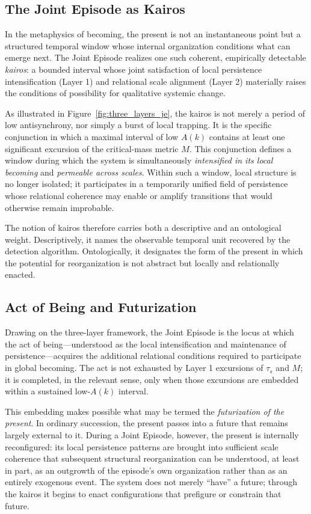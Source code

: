 \subsection{The Joint Episode as Kairos}

In the metaphysics of becoming, the present is not an instantaneous point but a structured temporal window whose internal organization conditions what can emerge next. The Joint Episode realizes one such coherent, empirically detectable \textit{kairos}: a bounded interval whose joint satisfaction of local persistence intensification (Layer 1) and relational scale alignment (Layer 2) materially raises the conditions of possibility for qualitative systemic change.

As illustrated in Figure~\ref{fig:three_layers_je}, the kairos is not merely a period of low antisynchrony, nor simply a burst of local trapping. It is the specific conjunction in which a maximal interval of low $A(k)$ contains at least one significant excursion of the critical-mass metric $M$. This conjunction defines a window during which the system is simultaneously \emph{intensified in its local becoming} and \emph{permeable across scales}. Within such a window, local structure is no longer isolated; it participates in a temporarily unified field of persistence whose relational coherence may enable or amplify transitions that would otherwise remain improbable.

The notion of kairos therefore carries both a descriptive and an ontological weight. Descriptively, it names the observable temporal unit recovered by the detection algorithm. Ontologically, it designates the form of the present in which the potential for reorganization is not abstract but locally and relationally enacted.

\subsection{Act of Being and Futurization}

Drawing on the three-layer framework, the Joint Episode is the locus at which the act of being---understood as the local intensification and maintenance of persistence---acquires the additional relational conditions required to participate in global becoming. The act is not exhausted by Layer 1 excursions of $\tau_s$ and $M$; it is completed, in the relevant sense, only when those excursions are embedded within a sustained low-$A(k)$ interval.

This embedding makes possible what may be termed the \textit{futurization of the present}. In ordinary succession, the present passes into a future that remains largely external to it. During a Joint Episode, however, the present is internally reconfigured: its local persistence patterns are brought into sufficient scale coherence that subsequent structural reorganization can be understood, at least in part, as an outgrowth of the episode's own organization rather than as an entirely exogenous event. The system does not merely ``have'' a future; through the kairos it begins to enact configurations that prefigure or constrain that future.

